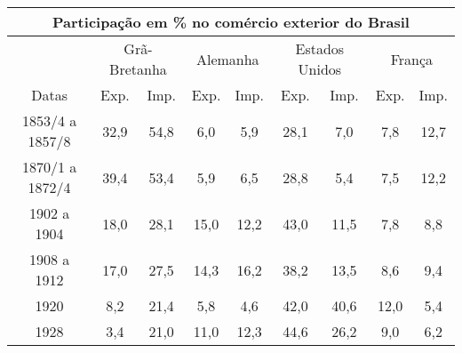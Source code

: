 \begin{table}[!htp]
\centering
{}
{\begin{tabular}{ccccccccc}
\hline
\multicolumn{9}{c}{Participação em \% no comércio exterior do Brasil} \\
\hline & \multicolumn{2}{c}{Grã-Bretanha} & \multicolumn{2}{c}{Alemanha} & \multicolumn{2}{c}{Estados Unidos} & \multicolumn{2}{c}{França} \\
\cline{2-9} Datas & Exp. & Imp. & Exp. & Imp. & Exp. & Imp. & Exp. & Imp. \\
\hline\hline
1853/4 a 1857/8 & 32,9 & 54,8 & 6,0 & 5,9 & 28,1 & 7,0 & 7,8 & 12,7 \\
1870/1 a 1872/4 & 39,4 & 53,4 & 5,9 & 6,5 & 28,8 & 5,4 & 7,5 & 12,2 \\
1902 a 1904 & 18,0 & 28,1 & 15,0 & 12,2 & 43,0 & 11,5 & 7,8 & 8,8 \\
1908 a 1912 & 17,0 & 27,5 & 14,3 & 16,2 & 38,2 & 13,5 & 8,6 & 9,4 \\
1920 & 8,2 & 21,4 & 5,8 & 4,6 & 42,0 & 40,6 & 12,0 & 5,4 \\
1928 & 3,4 & 21,0 & 11,0 & 12,3 & 44,6 & 26,2 & 9,0 & 6,2 \\
\hline
\end{tabular} }
{  }
\end{table}